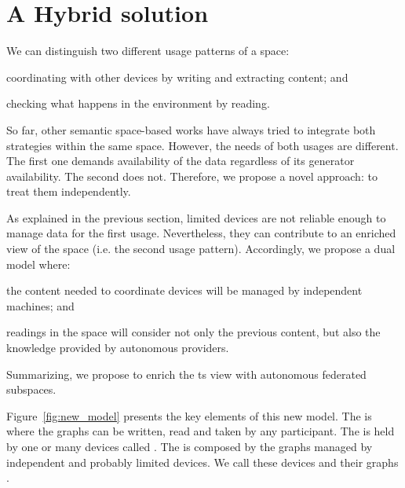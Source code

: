 \section{A Hybrid solution} %
\label{sec:hybrid_solution}

We can distinguish two different usage patterns of a space:
\begin{enumerate*}[label=\itshape(\arabic*\upshape)]
  \item coordinating with other devices by writing and extracting content; and %
  \item checking what happens in the environment by reading.
\end{enumerate*}
So far, other semantic space-based works have always tried to integrate both strategies within the same space.
However, the needs of both usages are different.
The first one demands availability of the data regardless of its generator availability.
The second does not. %
Therefore, we propose a novel approach: to treat them independently.



As explained in the previous section, limited devices are not reliable enough to manage data for the first usage.
Nevertheless, they can contribute to an enriched view of the space (i.e. the second usage pattern).
Accordingly, we propose a dual model where:
\begin{enumerate*}[label=\itshape(\arabic*\upshape)]
  \item the content needed to coordinate devices will be managed by independent machines; and
  \item readings in the space will consider not only the previous content, but also the knowledge provided by autonomous providers.
\end{enumerate*}
Summarizing, we propose to enrich the \ac{ts} view with autonomous federated subspaces.


Figure~\ref{fig:new_model} presents the key elements of this new model.
The \coordspace{} is where the graphs can be written, read and taken by any participant.
The \coordspace{} is held by one or many devices called \coordinators{}.
The \outerspace{} is composed by the graphs managed by independent and probably limited devices.
We call these devices \asteroids{} and their graphs \selfgraphs{}.

